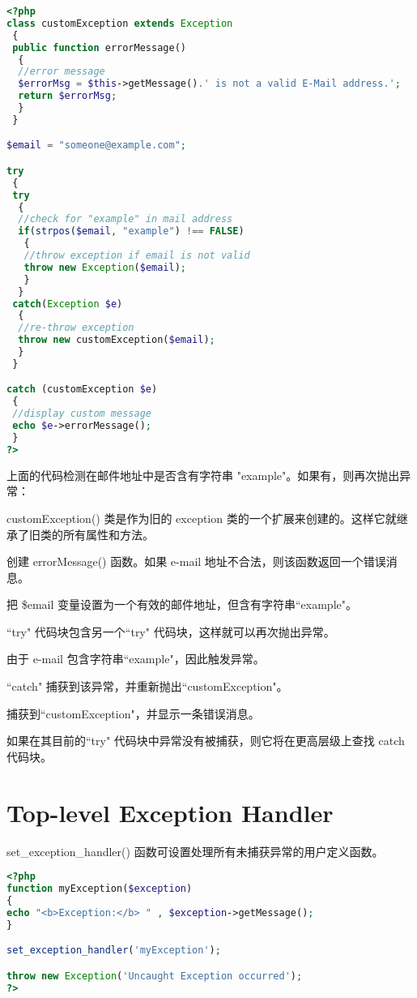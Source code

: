 \begin{lstlisting}[language=PHP]
<?php
class customException extends Exception
 {
 public function errorMessage()
  {
  //error message
  $errorMsg = $this->getMessage().' is not a valid E-Mail address.';
  return $errorMsg;
  }
 }

$email = "someone@example.com";

try
 {
 try
  {
  //check for "example" in mail address
  if(strpos($email, "example") !== FALSE)
   {
   //throw exception if email is not valid
   throw new Exception($email);
   }
  }
 catch(Exception $e)
  {
  //re-throw exception
  throw new customException($email);
  }
 }

catch (customException $e)
 {
 //display custom message
 echo $e->errorMessage();
 }
?>
\end{lstlisting}

上面的代码检测在邮件地址中是否含有字符串 "example"。如果有，则再次抛出异常：

\begin{compactenum}
\item customException() 类是作为旧的 exception 类的一个扩展来创建的。这样它就继承了旧类的所有属性和方法。
\item 创建 errorMessage() 函数。如果 e-mail 地址不合法，则该函数返回一个错误消息。
\item 把 \$email 变量设置为一个有效的邮件地址，但含有字符串``example"。
\item ``try" 代码块包含另一个``try" 代码块，这样就可以再次抛出异常。
\item 由于 e-mail 包含字符串``example"，因此触发异常。
\item ``catch" 捕获到该异常，并重新抛出``customException"。
\item 捕获到``customException"，并显示一条错误消息。
\end{compactenum}

如果在其目前的``try" 代码块中异常没有被捕获，则它将在更高层级上查找 catch 代码块。





\section{Top-level Exception Handler}

set\_exception\_handler() 函数可设置处理所有未捕获异常的用户定义函数。

\begin{lstlisting}[language=PHP]
<?php
function myException($exception)
{
echo "<b>Exception:</b> " , $exception->getMessage();
}

set_exception_handler('myException');

throw new Exception('Uncaught Exception occurred');
?>
\end{lstlisting}

